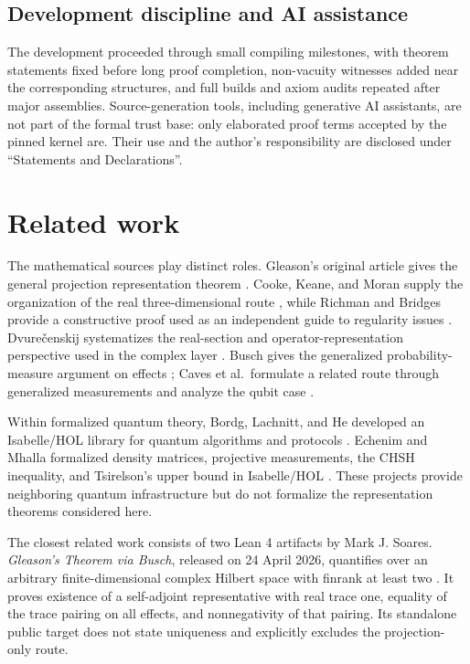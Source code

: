 \documentclass[pdflatex,sn-mathphys-num]{sn-jnl}
\theoremstyle{thmstyleone}
\theoremstyle{thmstylethree}
\begin{document}
\subsection{Development discipline and AI assistance}\label{development-discipline-and-ai-assistance}

The development proceeded through small compiling milestones, with theorem statements fixed before long proof completion, non-vacuity witnesses added near the corresponding structures, and full builds and axiom audits repeated after major assemblies. Source-generation tools, including generative AI assistants, are not part of the formal trust base: only elaborated proof terms accepted by the pinned kernel are. Their use and the author's responsibility are disclosed under ``Statements and Declarations''.

\section{Related work}\label{sec:related}

The mathematical sources play distinct roles. Gleason's original article gives the general projection representation theorem \cite{gleason1957}. Cooke, Keane, and Moran supply the organization of the real three-dimensional route \cite{cooke1985}, while Richman and Bridges provide a constructive proof used as an independent guide to regularity issues \cite{richman1999}. Dvure\v{c}enskij systematizes the real-section and operator-representation perspective used in the complex layer \cite{dvurecenskij1993}. Busch gives the generalized probability-measure argument on effects \cite{busch2003}; Caves et al.~formulate a related route through generalized measurements and analyze the qubit case \cite{caves2004}.

Within formalized quantum theory, Bordg, Lachnitt, and He developed an Isabelle/HOL library for quantum algorithms and protocols \cite{bordg2021}. Echenim and Mhalla formalized density matrices, projective measurements, the CHSH inequality, and Tsirelson's upper bound in Isabelle/HOL \cite{echenim2024}. These projects provide neighboring quantum infrastructure but do not formalize the representation theorems considered here.

The closest related work consists of two Lean 4 artifacts by Mark J. Soares. \emph{Gleason's Theorem via Busch}, released on 24 April 2026, quantifies over an arbitrary finite-dimensional complex Hilbert space with finrank at least two \cite{soaresbusch2026}. It proves existence of a self-adjoint representative with real trace one, equality of the trace pairing on all effects, and nonnegativity of that pairing. Its standalone public target does not state uniqueness and explicitly excludes the projection-only route.
\end{document}
